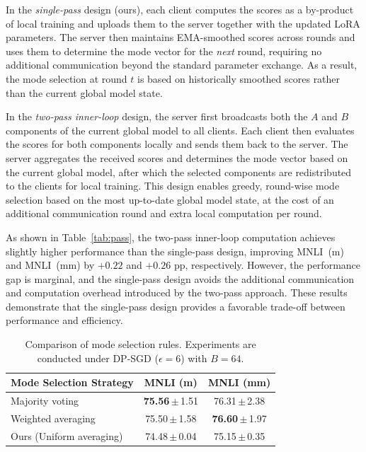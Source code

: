 In the \emph{single-pass} design (ours), each client computes the scores as a 
by-product of local training and uploads them to the server together with the 
updated LoRA parameters.
The server then maintains EMA-smoothed scores across rounds and uses them to 
determine the mode vector for the \emph{next} round, requiring no additional 
communication beyond the standard parameter exchange.
As a result, the mode selection at round $t$ is based on historically smoothed 
scores rather than the current global model state.

In the \emph{two-pass inner-loop} design, the server first broadcasts both the 
$A$ and $B$ components of the current global model to all clients.
Each client then evaluates the scores for both components locally and sends them 
back to the server.
The server aggregates the received scores and determines the mode vector based 
on the current global model, after which the selected components are redistributed 
to the clients for local training.
This design enables greedy, round-wise mode selection based on the most 
up-to-date global model state, at the cost of an additional communication round 
and extra local computation per round.

As shown in Table~\ref{tab:pass}, the two-pass inner-loop computation achieves 
slightly higher performance than the single-pass design, improving MNLI~(m) and 
MNLI~(mm) by $+0.22$ and $+0.26$ pp, respectively.
However, the performance gap is marginal, and the single-pass design avoids the 
additional communication and computation overhead introduced by the two-pass 
approach.
These results demonstrate that the single-pass design provides a favorable 
trade-off between performance and efficiency.


\begin{table}
\vspace{-13pt}
\centering
\scriptsize
\setlength{\tabcolsep}{2pt}
\renewcommand{\arraystretch}{1.05}
\newcommand{\std}[1]{\,{\tiny$\pm$}\,\tiny #1}

\caption{Comparison of mode selection rules. Experiments are conducted under DP-SGD ($\epsilon=6$) with $B=64$.}
\label{tab:mode_selection_ablation}

\begin{tabular}{lcc}
\toprule
\textbf{Mode Selection Strategy}
& \textbf{MNLI (m)}
& \textbf{MNLI (mm)} \\
\midrule

Majority voting
& \textbf{75.56}\std{1.51}
& 76.31\std{2.38} \\

Weighted averaging
& 75.50\std{1.58}
& \textbf{76.60}\std{1.97} \\


Ours (Uniform averaging)
& 74.48\std{0.04}
& 75.15\std{0.35} \\

\bottomrule
\end{tabular}
\end{table}
